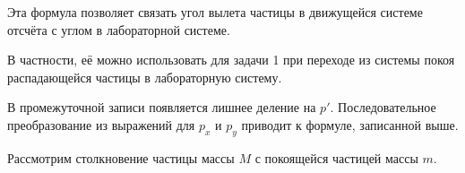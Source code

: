 \documentclass[../final.tex]{subfiles}
\begin{document}
Эта формула позволяет связать угол вылета частицы в движущейся
системе отсчёта с углом в лабораторной системе.

В частности, её можно использовать для задачи 1 при переходе
из системы покоя распадающейся частицы в лабораторную систему.

\remark[Комментарий.]
В промежуточной записи появляется лишнее деление на $p'$.
Последовательное преобразование из выражений для $p_x$ и $p_y$
приводит к формуле, записанной выше.



\newpage
{}

\condition

Рассмотрим столкновение частицы массы $M$
с покоящейся частицей массы $m$.
\end{document}
